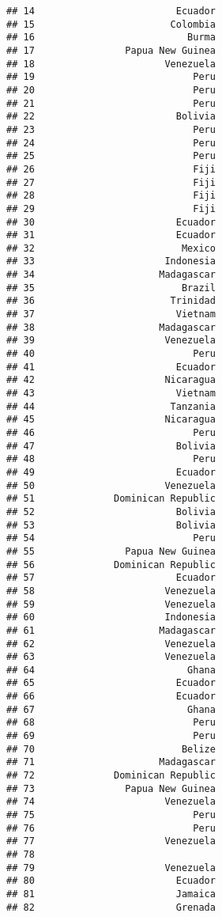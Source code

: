 \documentclass[
]{article}
\begin{document}
\begin{verbatim}
## 14                         Ecuador
## 15                        Colombia
## 16                           Burma
## 17                Papua New Guinea
## 18                       Venezuela
## 19                            Peru
## 20                            Peru
## 21                            Peru
## 22                         Bolivia
## 23                            Peru
## 24                            Peru
## 25                            Peru
## 26                            Fiji
## 27                            Fiji
## 28                            Fiji
## 29                            Fiji
## 30                         Ecuador
## 31                         Ecuador
## 32                          Mexico
## 33                       Indonesia
## 34                      Madagascar
## 35                          Brazil
## 36                        Trinidad
## 37                         Vietnam
## 38                      Madagascar
## 39                       Venezuela
## 40                            Peru
## 41                         Ecuador
## 42                       Nicaragua
## 43                         Vietnam
## 44                        Tanzania
## 45                       Nicaragua
## 46                            Peru
## 47                         Bolivia
## 48                            Peru
## 49                         Ecuador
## 50                       Venezuela
## 51              Dominican Republic
## 52                         Bolivia
## 53                         Bolivia
## 54                            Peru
## 55                Papua New Guinea
## 56              Dominican Republic
## 57                         Ecuador
## 58                       Venezuela
## 59                       Venezuela
## 60                       Indonesia
## 61                      Madagascar
## 62                       Venezuela
## 63                       Venezuela
## 64                           Ghana
## 65                         Ecuador
## 66                         Ecuador
## 67                           Ghana
## 68                            Peru
## 69                            Peru
## 70                          Belize
## 71                      Madagascar
## 72              Dominican Republic
## 73                Papua New Guinea
## 74                       Venezuela
## 75                            Peru
## 76                            Peru
## 77                       Venezuela
## 78                                
## 79                       Venezuela
## 80                         Ecuador
## 81                         Jamaica
## 82                         Grenada

\end{verbatim}
\end{document}
